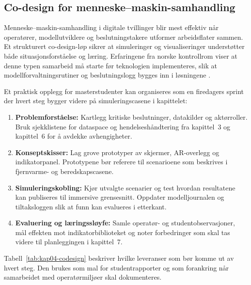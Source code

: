 \subsection{Co-design for menneske--maskin-samhandling}
Menneske--maskin-samhandling i digitale tvillinger blir mest effektiv når operatører, modellutviklere og beslutningstakere utformer arbeidsflater sammen. Et strukturert co-design-løp sikrer at simuleringer og visualiseringer understøtter både situasjonsforståelse og læring. Erfaringene fra norske kontrollrom viser at denne typen samarbeid må starte før teknologien implementeres, slik at modellforvaltningsrutiner og beslutningslogg bygges inn i løsningene \citep{kongsberg2023kognitwin,statnett2024kontrolltarn}.

Et praktisk opplegg for masterstudenter kan organiseres som en firedagers sprint der hvert steg bygger videre på simuleringscasene i kapittelet:
\begin{enumerate}
    \item \textbf{Problemforståelse:} Kartlegg kritiske beslutninger, datakilder og aktørroller. Bruk sjekklistene for dataspace og hendelseshåndtering fra kapittel~3 og kapittel~6 for å avdekke avhengigheter.
    \item \textbf{Konseptskisser:} Lag grove prototyper av skjermer, AR-overlegg og indikatorpanel. Prototypene bør referere til scenarioene som beskrives i fjernvarme- og beredskapscasene.
    \item \textbf{Simuleringskobling:} Kjør utvalgte scenarier og test hvordan resultatene kan publiseres til immersive grensesnitt. Oppdater modelljournalen og tiltaksloggen slik at funn kan evalueres i etterkant.
    \item \textbf{Evaluering og læringssløyfe:} Samle operatør- og studentobservasjoner, mål effekten mot indikatorbiblioteket og noter forbedringer som skal tas videre til planleggingen i kapittel~7.
\end{enumerate}

Tabell~\ref{tab:kap04-codesign} beskriver hvilke leveranser som bør komme ut av hvert steg. Den brukes som mal for studentrapporter og som forankring når samarbeidet med operatørmiljøer skal dokumenteres.

